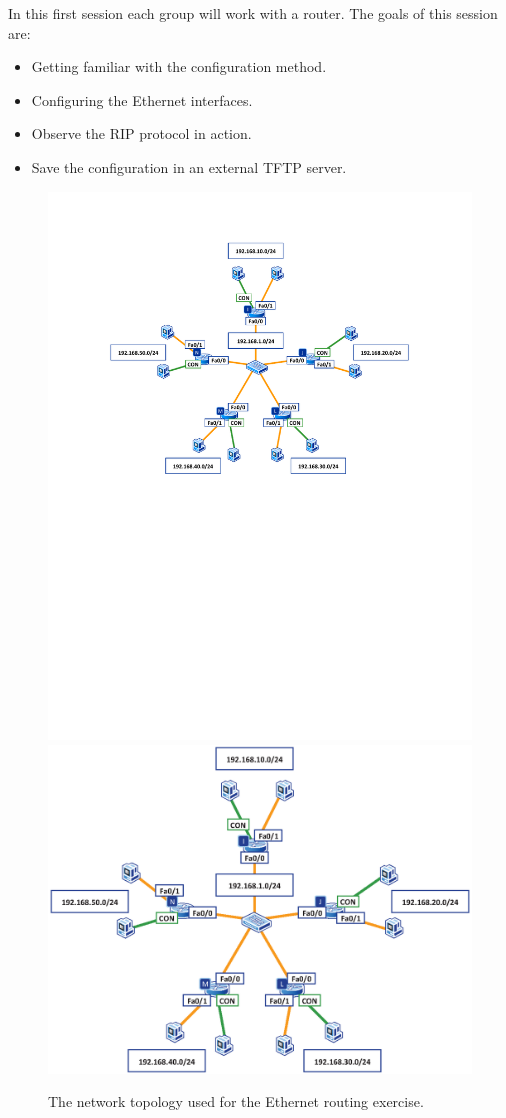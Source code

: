In this first session each group will work with a router. The goals of this session are:
\begin{itemize}
\item Getting familiar with the configuration method.
\item Configuring the Ethernet interfaces.
\item Observe the RIP protocol in action.
\item Save the configuration in an external TFTP server.
\end{itemize}

\begin{figure}
\centering
\ifpdf
\includegraphics[width=0.9\linewidth]{Figures/RoutingEthernet.pdf}
\else
\includegraphics[width=0.9\linewidth]{Figures/RoutingEthernet.eps}
\fi
\caption{The network topology used for the Ethernet routing exercise.}
\label{fig:RoutingEthernet}
\end{figure}


